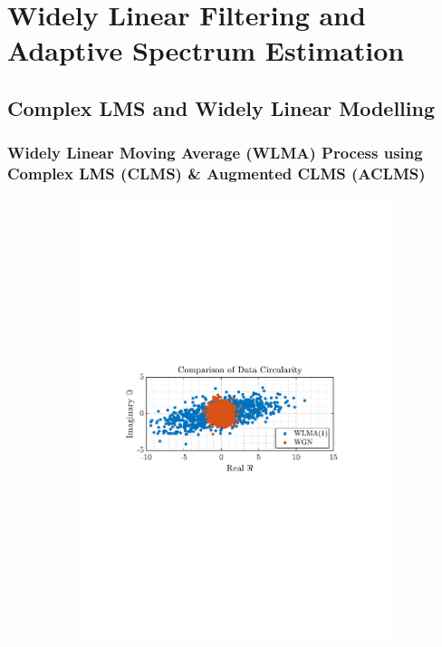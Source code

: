 \documentclass[12pt]{article}
\begin{document}
\pagebreak
\section{Widely Linear Filtering and Adaptive Spectrum Estimation} \label{sec: 3-WLASE}
	\subsection{Complex LMS and Widely Linear Modelling} \label{sec: 3-1-CLMS-ACLMS}
		\subsubsection{Widely Linear Moving Average (WLMA) Process using Complex LMS (CLMS) \& Augmented CLMS (ACLMS)}
			\begin{figure}[H]
				\centering
				\begin{subfigure}{0.49\textwidth}
					\centering
					\includegraphics[trim={2.2cm 11.2cm 3.00cm  11.2cm}, clip, width=\textwidth]{../MATLAB/figures/q3_1a_fig01.pdf} 

\end{subfigure}
\end{figure}
\end{document}
